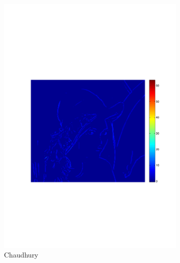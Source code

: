 \documentclass[twocolumn]{el-author}
\begin{document}
\begin{figure}[t]
\begin{subfigure}[b]{0.32\linewidth}
    \includegraphics[width=\linewidth]{5Chaudhury2}
    \caption{Chaudhury~\cite{Chaudhury_TIP_2011}}
    \label{fig:minimax_path:path}
\end{subfigure}
\begin{subfigure}[b]{0.32\linewidth}
    \centering

\end{subfigure}
\end{figure}
\end{document}
